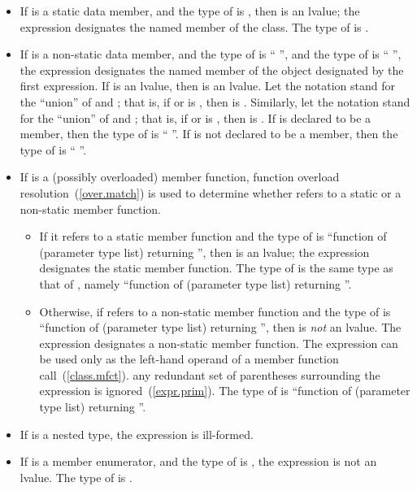 \begin{itemize}
\item If  is a static data member, and the type of 
is , then  is an lvalue; the expression designates
the named member of the class. The type of  is .

\item If  is a non-static data member, and the type of
 is `` '', and the type of 
is `` '', the expression designates the named
member of the object designated by the first expression. If 
is an lvalue, then  is an lvalue.
Let the notation  stand for the ``union'' of
 and ; that is, if  or 
is , then  is . Similarly,
let the notation  stand for the ``union'' of 
and ; that is, if  or  is
, then  is . If  is
declared to be a  member, then the type of 
is `` ''. If  is not declared to be a
 member, then the type of  is
``  ''.

\item If  is a (possibly overloaded) member function, function
overload resolution~(\ref{over.match}) is used to determine whether
 refers to a static or a non-static member function.

\begin{itemize}
\item If it refers to a static member function and the type of
 is ``function of (parameter type list) returning '',
then  is an lvalue; the expression designates the static
member function. The type of  is the same type as that of
, namely ``function of (parameter type list) returning
''.

\item Otherwise, if  refers to a non-static member
function and the type of  is ``function of (parameter type
list)  returning '', then  is
\emph{not} an lvalue. The expression designates a
non-static member function. The expression can be used only as the
left-hand operand of a member function call~(\ref{class.mfct}).
\enternote any redundant set of parentheses surrounding the expression
is ignored~(\ref{expr.prim}). \exitnote The type of  is
``function of (parameter type list)  returning ''.
\end{itemize}

\item If  is a nested type, the expression  is
ill-formed.

\item If  is a member enumerator, and the type of 
is , the expression  is not an lvalue. The type of
 is .
\end{itemize}

